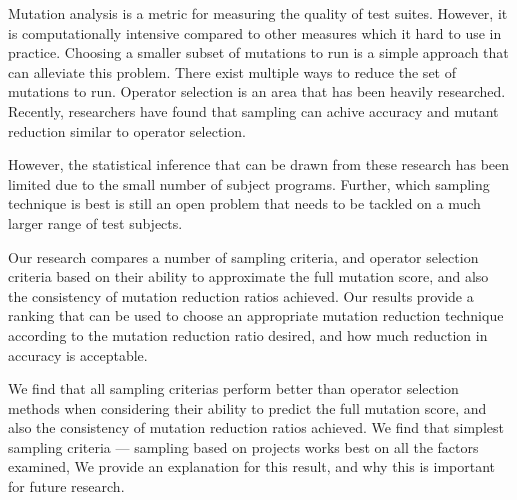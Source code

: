 Mutation analysis is a metric for measuring the quality of test suites. However, it is computationally intensive compared to other measures which it hard to use in practice. Choosing a smaller subset of mutations to run is a simple approach that can alleviate this problem. There exist multiple ways to reduce the set of mutations to run. Operator selection is an area that has been heavily researched. Recently, researchers have found that sampling can achive accuracy and mutant reduction similar to operator selection.

However, the statistical inference that can be drawn from these research has been limited due to the small number of subject programs. Further, which sampling technique is best is still an open problem that needs to be tackled on a much larger range of test subjects.

Our research compares a number of sampling criteria, and operator selection criteria based on their ability to approximate the full mutation score, and also the consistency of mutation reduction ratios achieved. Our results provide a ranking that can be used to choose an appropriate mutation reduction technique according to the mutation reduction ratio desired, and how much reduction in accuracy is acceptable.

We find that all sampling criterias perform better than operator selection methods when considering their ability to predict the full mutation score, and also the consistency of mutation reduction ratios achieved.
We find that simplest sampling criteria --- sampling based on projects works best on all the factors examined, We provide an explanation for this result, and why this is important for future research.


